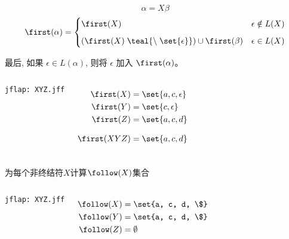 \begin{frame}{}
  \begin{center}

    \[
      \alpha = X \beta
    \]
    \[
      \first(\alpha) =
      \begin{cases}
        \first(X) & \epsilon \notin L(X) \\[6pt]
        (\first(X) \;\teal{\setminus\; \set{\epsilon}}) \cup \first(\beta) & \epsilon \in L(X)
      \end{cases}
    \]

    \vspace{0.60cm}
    最后, 如果 $\epsilon \in L(\alpha)$, 则将 $\epsilon$ 加入 $\first(\alpha)$。
  \end{center}
\end{frame}

\begin{frame}{}
  \begin{columns}
      
      \begin{center}
        \texttt{jflap: XYZ.jff}
      \end{center}
      \pause
      \begin{align*}
        \first(X) &= \set{a, c, \epsilon} \\
        \first(Y) &= \set{c, \epsilon} \\
        \first(Z) &= \set{a, c, d} \\[8pt]
        \first(XYZ) &= \set{a, c, d}
      \end{align*}
  \end{columns}
\end{frame}

\begin{frame}{}
  \begin{center}
    {\large 为每个非终结符$X$计算$\follow(X)$集合}

    

    \pause
  \end{center}
\end{frame}

\begin{frame}{}
  \begin{columns}
      
      \begin{center}
        \texttt{jflap: XYZ.jff}
      \end{center}
      \pause
      \begin{align*}
        \follow(X) &= \set{a, c, d, \$} \\
        \follow(Y) &= \set{a, c, d, \$} \\
        \follow(Z) &= \emptyset
      \end{align*}
  \end{columns}
\end{frame}

